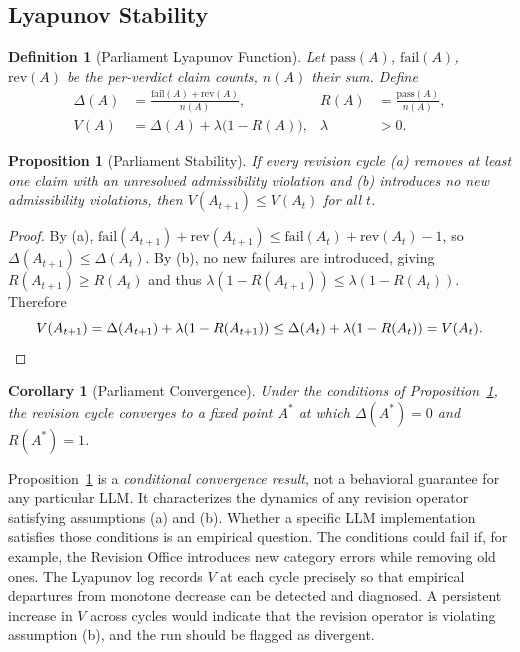 \documentclass[12pt, a4paper]{article}
\newtheorem{definition}{Definition}[section]
\newtheorem{proposition}{Proposition}[section]
\newtheorem{corollary}{Corollary}[section]
\theoremstyle{principle}
\theoremstyle{definition}
\begin{document}
\subsection{Lyapunov Stability}

\begin{definition}[Parliament Lyapunov Function]
Let $\mathrm{pass}(A)$, $\mathrm{fail}(A)$, $\mathrm{rev}(A)$ be the per-verdict
claim counts, $n(A)$ their sum. Define
\begin{align*}
\Delta(A) &= \frac{\mathrm{fail}(A) + \mathrm{rev}(A)}{n(A)}, &
R(A) &= \frac{\mathrm{pass}(A)}{n(A)}, \\[4pt]
V(A) &= \Delta(A) + \lambda\bigl(1 - R(A)\bigr), &
\lambda &> 0.
\end{align*}
\end{definition}

\begin{proposition}[Parliament Stability]
\label{prop:stability}
If every revision cycle (a) removes at least one claim with an unresolved
admissibility violation and (b) introduces no new admissibility violations,
then $V(A_{t+1}) \leq V(A_t)$ for all $t$.
\end{proposition}

\begin{proof}
By (a), $\mathrm{fail}(A_{t+1}) + \mathrm{rev}(A_{t+1})
\leq \mathrm{fail}(A_t) + \mathrm{rev}(A_t) - 1$,
so $\Delta(A_{t+1}) \leq \Delta(A_t)$.
By (b), no new failures are introduced, giving
$R(A_{t+1}) \geq R(A_t)$ and thus
$\lambda(1 - R(A_{t+1})) \leq \lambda(1 - R(A_t))$.
Therefore
\[
V(A_{t+1}) = \Delta(A_{t+1}) + \lambda(1 - R(A_{t+1}))
           \leq \Delta(A_t) + \lambda(1 - R(A_t)) = V(A_t). \qedhere
\]
\end{proof}

\begin{corollary}[Parliament Convergence]
Under the conditions of Proposition~\ref{prop:stability}, the revision cycle
converges to a fixed point $A^*$ at which $\Delta(A^*) = 0$ and $R(A^*) = 1$.
\end{corollary}

Proposition~\ref{prop:stability} is a \emph{conditional convergence result}, not a
behavioral guarantee for any particular LLM. It characterizes the dynamics of any
revision operator satisfying assumptions (a) and (b). Whether a specific LLM
implementation satisfies those conditions is an empirical question. The conditions
could fail if, for example, the Revision Office introduces new category errors while
removing old ones. The Lyapunov log records $V$ at each cycle precisely so that
empirical departures from monotone decrease can be detected and diagnosed. A
persistent increase in $V$ across cycles would indicate that the revision operator
is violating assumption (b), and the run should be flagged as divergent.
\end{document}
